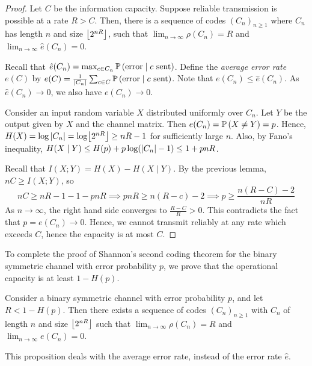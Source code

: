 \begin{proof}
    Let \( C \) be the information capacity.
    Suppose reliable transmission is possible at a rate \( R > C \).
    Then, there is a sequence of codes \( (C_n)_{n \geq 1} \) where \( C_n \) has length \( n \) and size \( \floor*{2^{nR}} \), such that \( \lim_{n \to \infty} \rho(C_n) = R \) and \( \lim_{n \to \infty} \hat e(C_n) = 0 \).

    Recall that \( \hat e(C_n) = \max_{c \in C_n} \prob{\text{error} \mid c \text{ sent}} \).
    Define the \emph{average error rate} \( e(C) \) by \( e(C) = \frac{1}{\abs{C_n}} \sum_{c \in C} \prob{\text{error} \mid c \text{ sent}} \).
    Note that \( e(C_n) \leq \hat e(C_n) \).
    As \( \hat e(C_n) \to 0 \), we also have \( e(C_n) \to 0 \).

    Consider an input random variable \( X \) distributed uniformly over \( C_n \).
    Let \( Y \) be the output given by \( X \) and the channel matrix.
    Then \( e(C_n) = \prob{X \neq Y} = p \).
    Hence, \( H(X) = \log \abs{C_n} = \log \floor*{2^{nR}} \geq nR - 1 \) for sufficiently large \( n \).
    Also, by Fano's inequality, \( H(X \mid Y) \leq H(p) + p \log(\abs{C_n} - 1) \leq 1 + pnR \).

    Recall that \( I(X;Y) = H(X) - H(X \mid Y) \).
    By the previous lemma, \( nC \geq I(X;Y) \), so
    \[ nC \geq nR - 1 - 1 - pnR \implies pnR \geq n(R - c) - 2 \implies p \geq \frac{n(R - C) - 2}{nR} \]
    As \( n \to \infty \), the right hand side converges to \( \frac{R - C}{R} > 0 \).
    This contradicts the fact that \( p = e(C_n) \to 0 \).
    Hence, we cannot transmit reliably at any rate which exceeds \( C \), hence the capacity is at most \( C \).
\end{proof}
To complete the proof of Shannon's second coding theorem for the binary symmetric channel with error probability \( p \), we prove that the operational capacity is at least \( 1 - H(p) \).
\begin{proposition}
    Consider a binary symmetric channel with error probability \( p \), and let \( R < 1 - H(p) \).
    Then there exists a sequence of codes \( (C_n)_{n \geq 1} \) with \( C_n \) of length \( n \) and size \( \floor*{2^{nR}} \) such that \( \lim_{n \to \infty} \rho(C_n) = R \) and \( \lim_{n \to \infty} e(C_n) = 0 \).
\end{proposition}
\begin{remark}
    This proposition deals with the average error rate, instead of the error rate \( \hat e \).
\end{remark}
